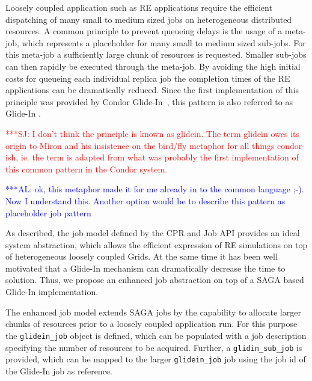 \documentclass{rspublic}
\newcommand{\alnote}[1]{ {\textcolor{blue} { ***AL: #1 }}}
\newcommand{\jhanote}[1]{ {\textcolor{red} { ***SJ: #1 }}}
\newcommand{\alnote}[1]{}
\newcommand{\jhanote}[1]{}
\newcommand{\glidein}[1]{Glide-In }
\begin{document}


Loosely coupled application such as RE applications require the efficient
dispatching of many small to medium sized jobs on heterogeneous distributed resources.
A common principle to prevent queueing delays is the usage of a meta-job, which
represents a placeholder for many small to medium sized sub-jobs. For this meta-job a
sufficiently large chunk of resources is requested. Smaller sub-jobs can then rapidly 
be executed through the meta-job.
By avoiding the high initial costs for queueing each individual 
replica job the completion times of the RE applications can be dramatically
reduced. Since the first implementation of this principle was provided by Condor 
Glide-In~\citep{citeulike:291860}, this pattern is also referred to as \glidein\ .

\jhanote{I
don't think the principle is known as glidein. The term glidein owes
its origin to Miron and his insistence on the bird/fly metaphor for
all things condor-ish, ie. the term is adapted from what was
probably the first implementation of this common pattern in the
Condor system.}             

\alnote{ok, this metaphor made it for me already in to the common language 
;-). Now I understand this. Another option would 
be to describe this pattern as 
placeholder job pattern}

As described, the job model defined by the CPR and Job API provides an ideal 
system abstraction, which allows the efficient expression of RE simulations on
top of heterogeneous loosely coupled Grids. At the same time it has been well motivated
that a \glidein\ mechanism can dramatically decrease the time to solution. Thus, we
propose an enhanced job abstraction on top of a SAGA based \glidein\ implementation.

The enhanced job model extends SAGA jobs by the
capability to allocate larger chunks of resources prior to a loosely
coupled application run. For this purpose the \texttt{glidein\_job} object is defined, which
can be populated with a job description specifying the number of resources to be acquired.
Further, a \texttt{glidin\_sub\_job} is provided, which can be mapped
to the larger \texttt{glidein\_job} job using the job id of the \glidein\ job as reference.
\end{document}
